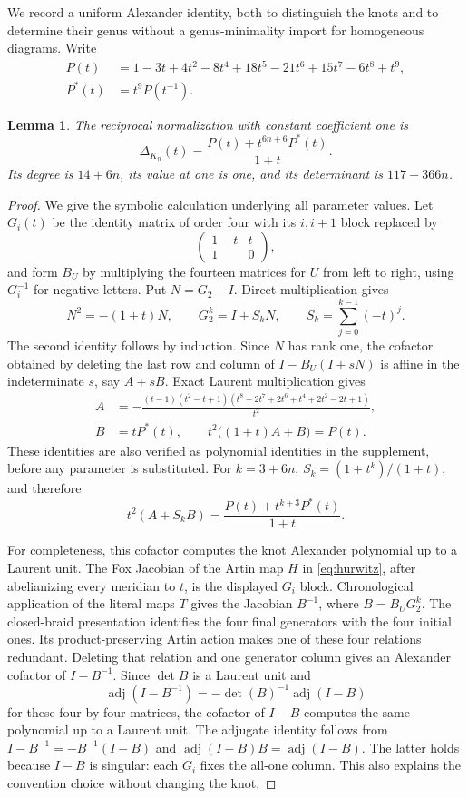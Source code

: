 \documentclass[11pt]{article}
\newtheorem{lemma}[theorem]{Lemma}
\begin{document}
We record a uniform Alexander identity, both to distinguish the knots
and to determine their genus without a genus-minimality import for
homogeneous diagrams. Write
\begin{align*}
 P(t)&=1-3t+4t^2-8t^4+18t^5-21t^6+15t^7-6t^8+t^9,\\
 P^*(t)&=t^9P(t^{-1}).
\end{align*}
\begin{lemma}\label{lem:alexander}
The reciprocal normalization with constant coefficient one is
\begin{equation}\label{eq:alexander}
 \Delta_{K_n}(t)=\frac{P(t)+t^{6n+6}P^*(t)}{1+t}.
\end{equation}
Its degree is $14+6n$, its value at one is one, and its determinant is
$117+366n$.
\end{lemma}
\begin{proof}
We give the symbolic calculation underlying all parameter values.
Let $G_i(t)$ be the identity matrix of order four with its $i,i+1$ block
replaced by
\[
 \begin{pmatrix}1-t&t\\1&0\end{pmatrix},
\]
and form $B_U$ by multiplying the fourteen matrices for $U$ from left
to right, using $G_i^{-1}$ for negative letters.
Put $N=G_2-I$. Direct multiplication gives
\[
 N^2=-(1+t)N,\qquad
 G_2^k=I+S_kN,\qquad S_k=\sum_{j=0}^{k-1}(-t)^j.
\]
The second identity follows by induction. Since $N$ has rank one, the
cofactor obtained by deleting the last row and column of
$I-B_U(I+sN)$ is affine in the indeterminate $s$, say $A+sB$.
Exact Laurent multiplication gives
\begin{align*}
 A&=-\frac{(t-1)(t^2-t+1)
 (t^8-2t^7+2t^6+t^4+2t^2-2t+1)}{t^2},\\
 B&=tP^*(t),\qquad t^2\big((1+t)A+B\big)=P(t).
\end{align*}
These identities are also verified as polynomial identities in the
supplement, before any parameter is substituted. For $k=3+6n$,
$S_k=(1+t^k)/(1+t)$, and therefore
\[
 t^2(A+S_kB)=\frac{P(t)+t^{k+3}P^*(t)}{1+t}.
\]

For completeness, this cofactor computes the knot Alexander polynomial
up to a Laurent unit. The Fox Jacobian of the Artin map $H$ in
\eqref{eq:hurwitz}, after abelianizing every meridian to $t$, is the
displayed $G_i$ block. Chronological application of the literal maps
$T$ gives the Jacobian $B^{-1}$, where $B=B_UG_2^k$.
The closed-braid presentation identifies the four final generators
with the four initial ones. Its product-preserving Artin action makes
one of these four relations redundant. Deleting that relation and one
generator column gives an Alexander cofactor of $I-B^{-1}$.
Since $\det B$ is a Laurent unit and
\[
 \operatorname{adj}(I-B^{-1})=-\det(B)^{-1}\operatorname{adj}(I-B)
\]
for these four by four matrices, the cofactor of $I-B$ computes the
same polynomial up to a Laurent unit. The adjugate identity follows
from $I-B^{-1}=-B^{-1}(I-B)$ and
$\operatorname{adj}(I-B)B=\operatorname{adj}(I-B)$.
The latter holds because $I-B$ is singular: each $G_i$ fixes the all-one
column. This also explains the convention choice without changing the
knot.


\end{proof}
\end{document}
